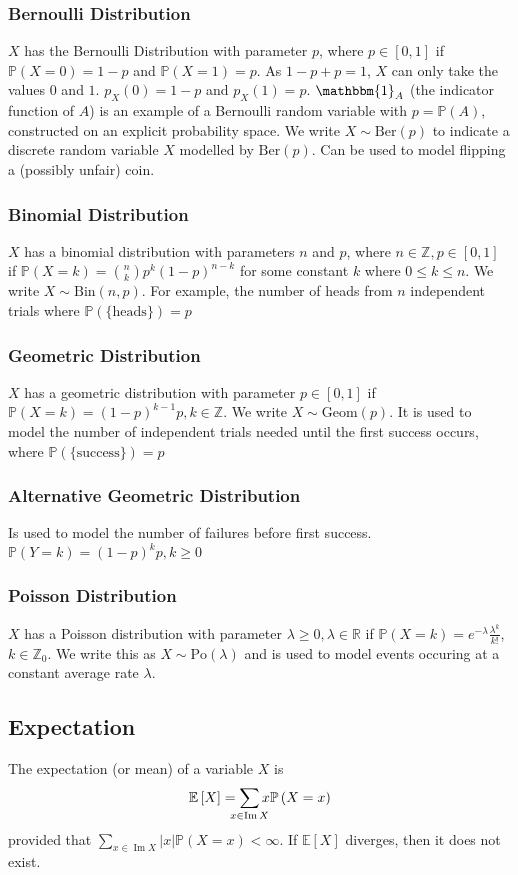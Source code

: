 \documentclass[fontsize=10pt]{article}
\numberwithin{equation}{subsection}
\newcommand{\PP}[1]{\mathbb{P}\left(#1\right)}
\newcommand{\EE}[1]{\mathbb{E}\left[#1\right]}
\newcommand{\image}{\mathop{\mathrm{Im}}}
\newcommand{\setreal}{\mathbb{R}}
\begin{document}
\begin{multicols}{2}
\subsubsection{Bernoulli Distribution}$X$ has the Bernoulli Distribution with parameter $p$, where $p\in\left[0,1\right]$ if $\PP{X=0}=1-p$ and $\PP{X=1}=p$.  As $1-p+p=1$, $X$ can only take the values $0$ and $1$.  $p_X(0)=1-p$ and $p_X(1)=p$.  $\mathbbm{1}_A$ (the indicator function of $A$) is an example of a Bernoulli random variable with $p=\PP{A}$, constructed on an explicit probability space.  We write $X\sim\mathrm{Ber}(p)$ to indicate a discrete random variable $X$ modelled by $\mathrm{Ber}(p)$.  Can be used to model flipping a (possibly unfair) coin.
\subsubsection{Binomial Distribution}$X$ has a binomial distribution with parameters $n$ and $p$, where $n\in\mathbb{Z},p\in\left[0,1\right]$ if $\PP{X=k}=\binom{n}{k}p^k(1-p)^{n-k}$ for some constant $k$ where $0\le k\le n$.  We write $X\sim\mathrm{Bin}(n,p)$. For example, the number of heads from $n$ independent trials where $\PP{\{\text{heads}\}}=p$
\subsubsection{Geometric Distribution}$X$ has a geometric distribution with parameter $p\in\left[0,1\right]$ if $\PP{X=k}=(1-p)^{k-1}p,k\in\mathbb{Z}$. We write $X\sim\mathrm{Geom}(p)$.  It is used to model the number of independent trials needed until the first success occurs, where $\PP{\{\text{success}\}}=p$
\subsubsection*{Alternative Geometric Distribution}Is used to model the number of failures before first success.  $\PP{Y=k}=(1-p)^kp,k\ge0$
\subsubsection{Poisson Distribution}$X$ has a Poisson distribution with parameter $\lambda\ge0,\lambda\in\setreal$ if $\PP{X=k}=e^{-\lambda}\frac{\lambda^k}{k!}$, $k\in\mathbb{Z}_0$.  We write this as $X\sim\mathrm{Po}(\lambda)$ and is used to model events occuring at a constant average rate $\lambda$.
\subsection{Expectation}
The expectation (or mean) of a variable $X$ is \[\EE{X}=\sum_{\mathclap{x\in\image X}}x\PP{X=x}\]provided that $\sum_{x\in\image X}\left|x\right|\PP{X=x}<\infty$.  If $\EE X$ diverges, then it does not exist.

\end{multicols}
\end{document}
